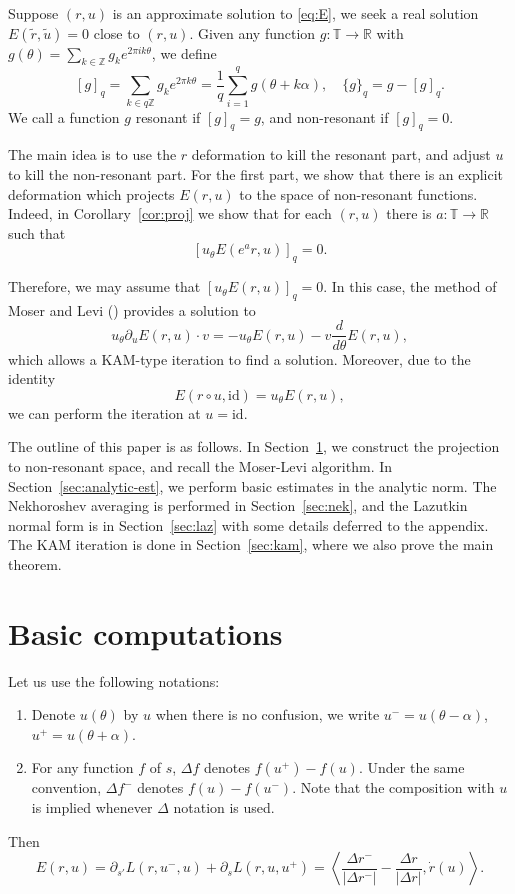 \documentclass[12pt,reqno]{amsart}
\theoremstyle{remark}
\begin{document}
Suppose $(r, u)$ is an approximate solution to \eqref{eq:E}, we seek  a real solution $E({\tilde{r}}, \tilde{u}) = 0$ close to $(r, u)$. Given any function $g: {\mathbb{T}} \to {\mathbb{R}}$ with $g(\theta) = \sum_{k \in {\mathbb{Z}}} g_k e^{2 \pi i k \theta}$, we define 
\[
	[g]_q = \sum_{k \in q{\mathbb{Z}}} g_k e^{2\pi k \theta} = \frac{1}{q}\sum_{i =1}^q g(\theta + k \alpha), \quad \{g\}_q = g - [g]_q.  
\]
We call a function $g$ resonant if $[g]_q = g$, and non-resonant if $[g]_q = 0$. 

The main idea is to use the $r$ deformation to kill the resonant part, and adjust $u$ to kill the non-resonant part. For the first part, we show that there is an explicit deformation which projects $E(r, u)$ to the space of non-resonant functions. Indeed, in Corollary~\ref{cor:proj} we show that for each $(r, u)$ there is $a: {\mathbb{T}} \to {\mathbb{R}}$ such that 
\[
	[u_\theta E(e^a r, u)]_q = 0. 
\]

Therefore, we may assume that $[u_\theta E(r, u)]_q = 0$. In this case, the method of Moser and Levi (\cite{LM2001}) provides a solution to 
\[
	u_\theta \partial_u E(r, u) \cdot v = - u_\theta E(r, u) - v \frac{d}{d\theta} E(r, u),
\]
which allows a KAM-type iteration to find a solution. Moreover, due to the identity 
\[
	E(r \circ u, {\mathrm{id}}) = u_\theta E(r, u), 
\]
we can perform the iteration at $u = {\mathrm{id}}$. 

The outline of this paper is as follows. In Section~\ref{sec:comp}, we construct the projection to non-resonant space, and recall the Moser-Levi algorithm. In Section~\ref{sec:analytic-est}, we perform basic estimates in the analytic norm. The Nekhoroshev averaging is performed in Section~\ref{sec:nek}, and the Lazutkin normal form is in Section~\ref{sec:laz} with some details deferred to the appendix. The KAM iteration is done in Section~\ref{sec:kam}, where we also prove the main theorem. 

\section{Basic computations}
\label{sec:comp}

Let us use the following notations:
\begin{enumerate}
	\item Denote $u(\theta)$ by $u$ when there is no confusion, we write $u^- = u(\theta  -\alpha)$, $u^+ = u(\theta + \alpha)$.
	\item For any function $f$ of $s$, $\Delta f$ denotes $f(u^+) - f(u)$. Under the same convention, $\Delta f^-$ denotes $f(u) - f(u^-)$. Note that the composition with $u$ is implied whenever $\Delta$ notation is used. 
\end{enumerate}
Then
\begin{equation}
	\label{eq:E}
	E(r, u)  = \partial_{s'} L(r, u^-, u) + \partial_{s} L(r, u, u^+) 
	= \left\langle   
	\frac{\Delta r^-}{|\Delta r^-|} - \frac{\Delta r}{|\Delta r|} , \dot{r}(u) 
	\right\rangle .
\end{equation}
\end{document}
